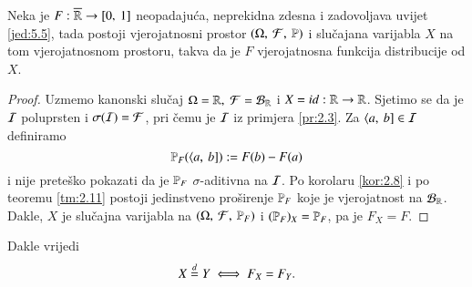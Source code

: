 \begin{tm}  \label{tm:5.6}
    Neka je $F: \overline{\mathbb{R}} \to [{0}, \:{1}]$ neopadaju\' ca, neprekidna zdesna i zadovoljava uvijet \eqref{jed:5.5}, tada postoji vjerojatnosni prostor $(\Omega, \: \mathcal{F}, \: \mathbb{P})$ i slu\v cajana varijabla $X$ na tom vjerojatnosnom prostoru, takva da je $F$ vjerojatnosna funkcija distribucije od $X$.
\end{tm}

\begin{proof}
    Uzmemo kanonski slu\v caj $\Omega = \mathbb{R}, \; \mathcal{F} = \mathcal{B}_{\mathbb{R}}$ i $X = id : \mathbb{R} \to \mathbb{R}$.
    Sjetimo se da je $\mathcal{I}$ poluprsten i $\sigma({\mathcal{I}}) = \mathcal{F}$, pri \v cemu je $\mathcal{I}$ iz primjera \ref{pr:2.3}.
    Za $\langle {a}, \: {b}] \in\mathcal{I}$ definiramo
    \begin{equation}    \label{jed:5.7}
        \mathbb{P}_F (\langle {a}, \: {b}]) := F (b) - F(a)
    \end{equation}
    i nije prete\v sko pokazati da je $\mathbb{P}_F$ $\sigma$-aditivna na $\mathcal{I}$.
    Po korolaru \ref{kor:2.8} i po teoremu \ref{tm:2.11} postoji jedinstveno pro\v sirenje $\mathbb{P}_F$ koje je vjerojatnost na $\mathcal{B}_{\mathbb{R}}$.
    Dakle, $X$ je slu\v cajna varijabla na $(\Omega, \: \mathcal{F}, \: \mathbb{P}_F)$ i $(\mathbb{P}_F)_X = \mathbb{P}_F$, pa je $F_X = F$.
\end{proof}

Dakle vrijedi
\begin{equation*}
    X \overset{d}{=} Y \iff F_X = F_Y.
\end{equation*}


